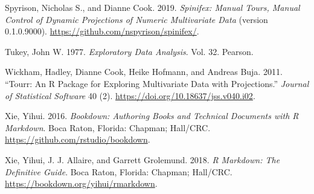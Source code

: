 \documentclass[
  11,
]{article}
\begin{document}
\leavevmode\hypertarget{ref-spyrison_spinifex_2019}{}%
Spyrison, Nicholas S., and Dianne Cook. 2019. \emph{Spinifex: Manual Tours, Manual Control of Dynamic Projections of Numeric Multivariate Data} (version 0.1.0.9000). \url{https://github.com/nspyrison/spinifex/}.

\leavevmode\hypertarget{ref-tukey_exploratory_1977}{}%
Tukey, John W. 1977. \emph{Exploratory Data Analysis}. Vol. 32. Pearson.

\leavevmode\hypertarget{ref-wickham_tourr:_2011}{}%
Wickham, Hadley, Dianne Cook, Heike Hofmann, and Andreas Buja. 2011. ``Tourr: An R Package for Exploring Multivariate Data with Projections.'' \emph{Journal of Statistical Software} 40 (2). \url{https://doi.org/10.18637/jss.v040.i02}.

\leavevmode\hypertarget{ref-xie_bookdown:_2016}{}%
Xie, Yihui. 2016. \emph{Bookdown: Authoring Books and Technical Documents with R Markdown}. Boca Raton, Florida: Chapman; Hall/CRC. \url{https://github.com/rstudio/bookdown}.

\leavevmode\hypertarget{ref-xie_r_2018}{}%
Xie, Yihui, J. J. Allaire, and Garrett Grolemund. 2018. \emph{R Markdown: The Definitive Guide}. Boca Raton, Florida: Chapman; Hall/CRC. \url{https://bookdown.org/yihui/rmarkdown}.
\end{document}
